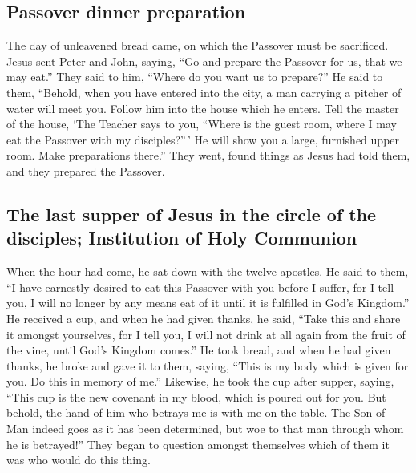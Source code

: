 \hypertarget{passover-dinner-preparation}{%
\subsection{Passover dinner
preparation}\label{passover-dinner-preparation}}

 The day of unleavened bread came, on which the Passover
must be sacrificed.  Jesus sent Peter and John, saying,
``Go and prepare the Passover for us, that we may eat.'' 
They said to him, ``Where do you want us to prepare?'' 
He said to them, ``Behold, when you have entered into the city, a man
carrying a pitcher of water will meet you. Follow him into the house
which he enters.  Tell the master of the house, `The
Teacher says to you, ``Where is the guest room, where I may eat the
Passover with my disciples?''\,'  He will show you a
large, furnished upper room. Make preparations there.'' 
They went, found things as Jesus had told them, and they prepared the
Passover.

\hypertarget{the-last-supper-of-jesus-in-the-circle-of-the-disciples-institution-of-holy-communion}{%
\subsection{The last supper of Jesus in the circle of the disciples;
Institution of Holy
Communion}\label{the-last-supper-of-jesus-in-the-circle-of-the-disciples-institution-of-holy-communion}}

 When the hour had come, he sat down with the twelve
apostles.  He said to them, ``I have earnestly desired to
eat this Passover with you before I suffer,  for I tell
you, I will no longer by any means eat of it until it is fulfilled in
God's Kingdom.''  He received a cup, and when he had
given thanks, he said, ``Take this and share it amongst yourselves,
 for I tell you, I will not drink at all again from the
fruit of the vine, until God's Kingdom comes.''  He took
bread, and when he had given thanks, he broke and gave it to them,
saying, ``This is my body which is given for you. Do this in memory of
me.''  Likewise, he took the cup after supper, saying,
``This cup is the new covenant in my blood, which is poured out for you.
 But behold, the hand of him who betrays me is with me on
the table.  The Son of Man indeed goes as it has been
determined, but woe to that man through whom he is betrayed!''
 They began to question amongst themselves which of them
it was who would do this thing.

